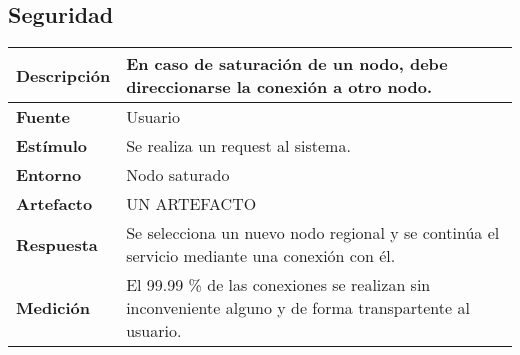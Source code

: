 \subsection{Seguridad}

\begin{center}
  \begin{tabular}{| l | p{10cm} | }
    \hline
  \textbf{Descripción} & En caso de saturación de un nodo, debe direccionarse la conexión a otro nodo.\\  \hline
  \textbf{Fuente} & Usuario\\  \hline
  \textbf{Estímulo} & Se realiza un request al sistema.\\  \hline
  \textbf{Entorno} & Nodo saturado\\  \hline
  \textbf{Artefacto} & UN ARTEFACTO\\  \hline
  \textbf{Respuesta} & Se selecciona un nuevo nodo regional y se continúa el servicio mediante una conexión con él.\\  \hline
  \textbf{Medición} & El 99.99 \% de las conexiones se realizan sin inconveniente alguno y de forma transpartente al usuario.\\  \hline
  \end{tabular}
\end{center} 
